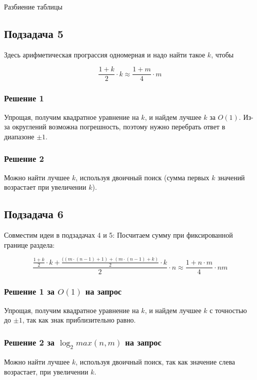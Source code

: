 \begin{tutorial}{Разбиение таблицы}
\subsection*{Подзадача 5}
Здесь арифметическая програссия одномерная и надо найти такое $k$, чтобы  

$$\frac{1 + k}{2} \cdot k \approx \frac{1 + m}{4} \cdot m$$

\subsubsection*{Решение 1}
Упрощая, получим квадратное уравнение на $k$, и найдем лучшее $k$ за $O(1)$. Из-за округлений возможна погрешность, поэтому нужно перебрать ответ в диапазоне $\pm 1$.
\subsubsection*{Решение 2} 
Можно найти лучшее $k$, используя двоичный поиск (сумма первых $k$ значений возрастает при увеличении $k$).

\subsection*{Подзадача 6}
Совместим идеи в подзадачах 4 и 5:
Посчитаем сумму при фиксированной границе раздела:

$$\frac{\frac{1 + k}{2} \cdot k + \frac{((m \cdot (n - 1) + 1) + (m \cdot (n - 1) + k)}{2} \cdot k}{2} \cdot n \approx \frac{1 + n \cdot m}{4} \cdot nm$$

\subsubsection*{Решение 1 за $O(1)$ на запрос}
Упрощая, получим квадратное уравнение на $k$, и найдем лучшее $k$ с точностью до $\pm 1$, так как знак приблизительно равно. 

\subsubsection*{Решение 2 за $\log_2{max(n, m)}$ на запрос} 
Можно найти лучшее $k$, используя двоичный поиск, так как значение слева возрастает, при увеличении $k$.

\end{tutorial}
